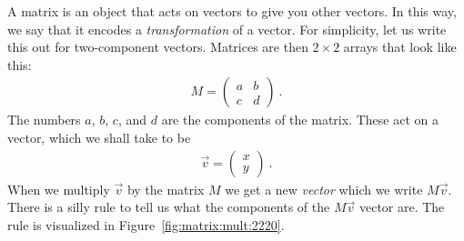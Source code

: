 \documentclass[12pt, oneside]{report}    %
\begin{document}
A matrix is an object that acts on vectors to give you other vectors. In this way, we say that it encodes a \emph{transformation} of a vector. For simplicity, let us write this out for two-component vectors. Matrices are then $2\times2$ arrays that look like this:
\begin{align}
    M = \begin{pmatrix}
        a & b\\
        c & d
    \end{pmatrix} \ .
\end{align}
The numbers $a$, $b$, $c$, and $d$ are the components of the matrix. These act on a vector, which we shall take to be
\begin{align}
    \vec{v} = \begin{pmatrix}
        x \\ y
    \end{pmatrix} \ .
\end{align}
% 
When we multiply $\vec{v}$ by the matrix $M$ we get a new \emph{vector} which we write $M\vec{v}$. 
There is a silly rule to tell us what the components of the $M\vec{v}$ vector are.
The rule is visualized in Figure~\ref{fig:matrix:mult:2220}.
\end{document}
